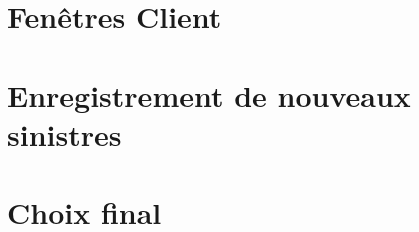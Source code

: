 \documentclass[10pt,a4paper]{article}
\begin{document}
\section{Fenêtres Client}

\section{Enregistrement de nouveaux sinistres}

\section{Choix final}
\end{document}
